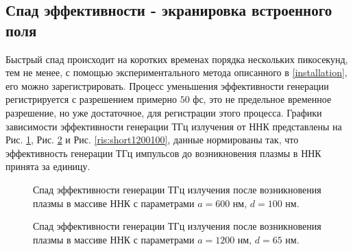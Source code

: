 \documentclass[a4paper,14pt,russian]{extreport}
\begin{document}
			\subsection{Спад эффективности - экранировка встроенного поля}
				Быстрый спад происходит на коротких временах порядка нескольких пикосекунд, тем не менее, с помощью экспериментального метода описанного в \ref{installation}, его можно зарегистрировать. Процесс уменьшения эффективности генерации регистрируется с разрешением примерно $50 \text{ фс}$, это не предельное временное разрешение, но уже достаточное, для регистрации этого процесса. Графики зависимости эффективности генерации ТГц излучения от ННК представлены на Рис. \ref{ris:short600100}, Рис. \ref{ris:short120065} и Рис. \ref{ris:short1200100}, данные нормированы так, что эффективность генерации ТГц импульсов до возникновения плазмы в ННК принята за единицу.\par
				\begin{figure}[H]
					\caption{Спад эффективности генерации ТГц излучения после возникновения плазмы в массиве ННК с параметрами $a = 600 \text{ нм, } d = 100 \text{ нм}$.}
				\label{ris:short600100}
				\end{figure}
				\begin{figure}[H]
					\caption{Спад эффективности генерации ТГц излучения после возникновения плазмы в массиве ННК с параметрами $a = 1200 \text{ нм, } d = 65 \text{ нм}$.}
				\label{ris:short120065}
				\end{figure}
\end{document}
